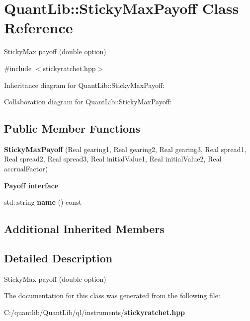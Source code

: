 \section{Quant\+Lib\+:\+:Sticky\+Max\+Payoff Class Reference}
\label{class_quant_lib_1_1_sticky_max_payoff}


Sticky\+Max payoff (double option)  




{\ttfamily \#include $<$stickyratchet.\+hpp$>$}



Inheritance diagram for Quant\+Lib\+:\+:Sticky\+Max\+Payoff\+:


Collaboration diagram for Quant\+Lib\+:\+:Sticky\+Max\+Payoff\+:
\subsection*{Public Member Functions}
\begin{DoxyCompactItemize}
\item 
{\bfseries Sticky\+Max\+Payoff} (Real gearing1, Real gearing2, Real gearing3, Real spread1, Real spread2, Real spread3, Real initial\+Value1, Real initial\+Value2, Real accrual\+Factor)\label{class_quant_lib_1_1_sticky_max_payoff_a06f47f592bb2bc1d37d866974a6a39ab}

\end{DoxyCompactItemize}
\begin{Indent}{\bf Payoff interface}\par
\begin{DoxyCompactItemize}
\item 
std\+::string {\bfseries name} () const \label{class_quant_lib_1_1_sticky_max_payoff_a0d0d6f037430934449cac16b2deaffc4}

\end{DoxyCompactItemize}
\end{Indent}
\subsection*{Additional Inherited Members}


\subsection{Detailed Description}
Sticky\+Max payoff (double option) 

The documentation for this class was generated from the following file\+:\begin{DoxyCompactItemize}
\item 
C\+:/quantlib/\+Quant\+Lib/ql/instruments/{\bf stickyratchet.\+hpp}\end{DoxyCompactItemize}
